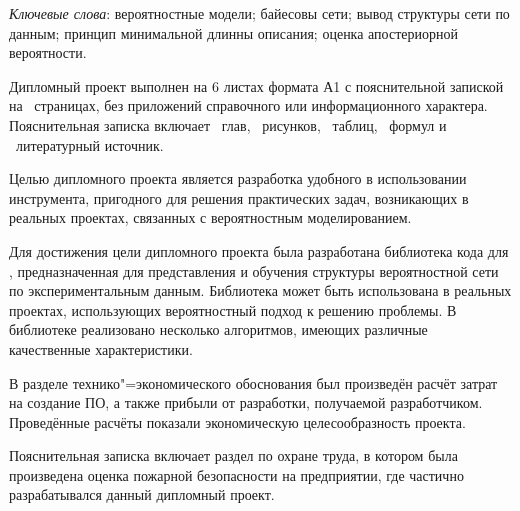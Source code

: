 \thispagestyle{empty}

\emph{Ключевые слова}: вероятностные модели; байесовы сети; вывод структуры сети по данным; принцип минимальной длинны описания; оценка апостериорной вероятности.

\vspace{4\parsep}

Дипломный проект выполнен на 6 листах формата А1 с пояснительной запиской на~\pageref*{LastPage} страницах, без приложений справочного или информационного характера. 
Пояснительная записка включает ~глав, \totfig{}~рисунков, \tottab{}~таблиц, \toteq{}~формул и \totref{}~литературный источник.

Целью дипломного проекта является разработка удобного в использовании инструмента, пригодного для решения практических задач, возникающих в реальных проектах, связанных с вероятностным моделированием.

Для достижения цели дипломного проекта была разработана библиотека кода для \dotnet{}, предназначенная для представления и обучения структуры вероятностной сети по экспериментальным данным.
Библиотека может быть использована в реальных проектах, использующих вероятностный подход к решению проблемы.
В библиотеке реализовано несколько алгоритмов, имеющих различные качественные характеристики.

В разделе технико"=экономического обоснования был произведён расчёт затрат на создание ПО, а также прибыли от разработки, получаемой разработчиком.
Проведённые расчёты показали экономическую целесообразность проекта.

Пояснительная записка включает раздел по охране труда, в котором была произведена оценка пожарной безопасности на предприятии, где частично разрабатывался данный дипломный проект.

\clearpage
